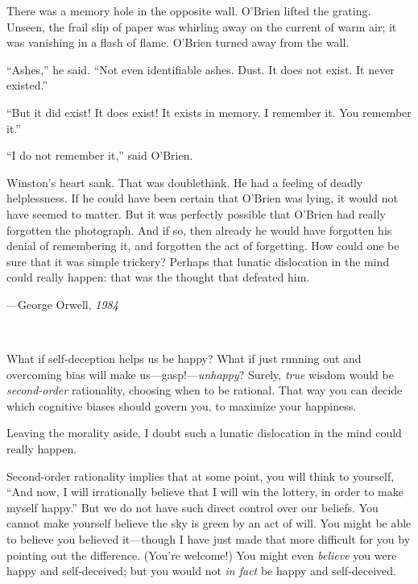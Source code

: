 {
 There was a memory hole in the opposite wall.
O'Brien lifted the grating. Unseen, the frail slip of
paper was whirling away on the current of warm air; it was vanishing in
a flash of flame. O'Brien turned away from the wall.}

{
 ``Ashes,'' he said.
``Not even identifiable ashes. Dust. It does not
exist. It never existed.''}

{
 ``But it did exist! It does exist! It exists in
memory. I remember it. You remember it.''}

{
 ``I do not remember it,'' said
O'Brien.}

{
 Winston's heart sank. That was doublethink. He had
a feeling of deadly helplessness. If he could have been certain that
O'Brien was lying, it would not have seemed to matter.
But it was perfectly possible that O'Brien had really
forgotten the photograph. And if so, then already he would have
forgotten his denial of remembering it, and forgotten the act of
forgetting. How could one be sure that it was simple trickery? Perhaps
that lunatic dislocation in the mind could really happen: that was the
thought that defeated him.}

{\raggedleft
 {}---George Orwell, \textit{1984}
\par}


\bigskip

{
 ~}

{
 What if self-deception helps us be happy? What if just running out
and overcoming bias will make us---gasp!---\textit{unhappy}? Surely,
\textit{true} wisdom would be \textit{second-order} rationality,
choosing when to be rational. That way you can decide which cognitive
biases should govern you, to maximize your happiness.}

{
 Leaving the morality aside, I doubt such a lunatic dislocation in
the mind could really happen.}

{
 Second-order rationality implies that at some point, you will
think to yourself, ``And now, I will irrationally
believe that I will win the lottery, in order to make myself
happy.'' But we do not have such direct control over
our beliefs. You cannot make yourself believe the sky is green by an
act of will. You might be able to believe you believed it---though I
have just made that more difficult for you by pointing out the
difference. (You're welcome!) You might even
\textit{believe} you were happy and self-deceived; but you would not
\textit{in fact} be happy and self-deceived.}

